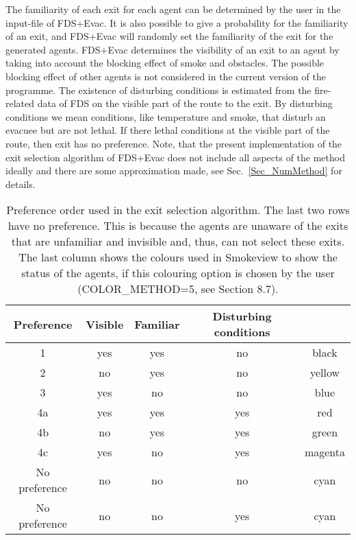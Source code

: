 \documentclass[12pt,a4paper,final,twoside]{stylevk}
\begin{document}
The familiarity of each exit for each agent can be determined by the
user in the input-file of FDS+Evac.  It is also possible to give a
probability for the familiarity of an exit, and FDS+Evac will randomly
set the familiarity of the exit for the generated agents.  FDS+Evac
determines the visibility of an exit to an agent by taking into
account the blocking effect of smoke and obstacles.  The possible
blocking effect of other agents is not considered in the current
version of the programme.  The existence of disturbing conditions is
estimated from the fire-related data of FDS on the visible part of the
route to the exit.  By disturbing conditions we mean conditions, like
temperature and smoke, that disturb an evacuee but are not lethal.  If
there lethal conditions at the visible part of the route, then exit
has no preference.  Note, that the present implementation of the exit
selection algorithm of FDS+Evac does not include all aspects of the
method ideally and there are some approximation made, see
Sec.~\ref{Sec_NumMethod} for details.


%
\begin{table}[!b]
\begin{center}
\caption{Preference order used in the exit selection algorithm.  The 
last two rows have no preference.  This is because the agents are
unaware of the exits that are unfamiliar and invisible and, thus,
can not select these exits.  The last column shows the colours used in
Smokeview to show the status of the agents, if this colouring option
is chosen by the user (COLOR_METHOD=5, see Section 8.7).}\label{Table_pref_order}
\vspace{12pt}
\begin{tabular}{c|c|c|c|c} \hline \hline
Preference&Visible&Familiar&Disturbing conditions\\ \hline 
1&yes&yes&no&black\\ \hline
2&no&yes&no&yellow\\ \hline 
3&yes&no&no&blue\\ \hline 
4a&yes&yes&yes&red\\ \hline 
4b&no&yes&yes&green\\ \hline 
4c&yes&no&yes&magenta\\ \hline 
No preference&no&no&no&cyan\\ \hline 
No preference&no&no&yes&cyan\\ \hline \hline
\end{tabular}
\end{center}
\end{table}
%
\end{document}
